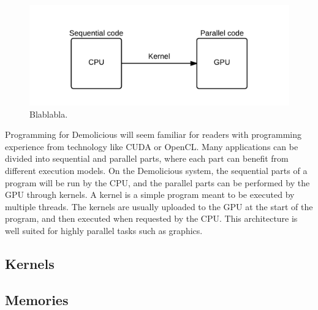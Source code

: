 \begin{figure}[H]
	\centering
	\includegraphics[width=\textwidth]{system_overview/diagrams/programming_model_cpu_gpu.png}
	\caption{Blablabla.}
	\label{programming_model_cpu_gpu}
\end{figure}
Programming for Demolicious will seem familiar for readers with programming experience from technology like CUDA or OpenCL. 
Many applications can be divided into sequential and parallel parts, where each part can benefit from different execution models. 
On the Demolicious system, the sequential parts of a program will be run by the CPU, and the parallel parts can be performed by the GPU through kernels.
A kernel is a simple program meant to be executed by multiple threads.
The kernels are usually uploaded to the GPU at the start of the program, and then executed when requested by the CPU.
This architecture is well suited for highly parallel tasks such as graphics.
\subsection{Kernels}

\subsection{Memories}

